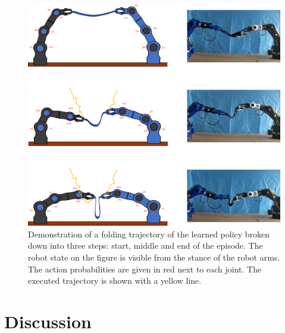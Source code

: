 \documentclass[\home/main.tex]{subfiles}
\begin{document}
\begin{figure}[htpb]
    \centering
    \includegraphics[width=\textwidth, keepaspectratio]{figures/robot_success_merge_with_pics.png}
    \caption[Demonstration of a folding trajectory of the learned policy.]{Demonstration of a folding trajectory of the learned policy broken down into three steps: start, middle and end of the episode. The robot state on the figure is visible from the stance of the robot arms. The action probabilities are given in red next to each joint. The executed trajectory is shown with a yellow line.  }
    \label{fig:robot_success_merge}
\end{figure}


\section{Discussion} \label{sec:instrumentation_discussion}
\end{document}
